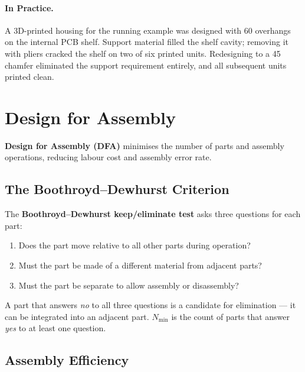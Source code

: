\paragraph{In Practice.}
A 3D-printed housing for the running example was designed with 60\textdegree{}
overhangs on the internal PCB shelf.
Support material filled the shelf cavity; removing it with pliers cracked the
shelf on two of six printed units.
Redesigning to a 45\textdegree{} chamfer eliminated the support requirement
entirely, and all subsequent units printed clean.

\section{Design for Assembly}
\label{sec:ch7-dfa}

\textbf{Design for Assembly (DFA)} minimises the
number of parts and assembly operations, reducing labour cost and assembly
error rate.

\subsection{The Boothroyd--Dewhurst Criterion}
\label{sec:ch7-dfa-bd}

The \textbf{Boothroyd--Dewhurst keep/eliminate test} asks three questions for each part:

\begin{enumerate}
  \item Does the part move relative to all other parts during operation?
  \item Must the part be made of a different material from adjacent parts?
  \item Must the part be separate to allow assembly or disassembly?
\end{enumerate}

A part that answers \emph{no} to all three questions is a candidate for
elimination --- it can be integrated into an adjacent part.
$N_{\min}$ is the count of parts that answer \emph{yes} to at least one question.

\subsection{Assembly Efficiency}
\label{sec:ch7-dfa-eta}

